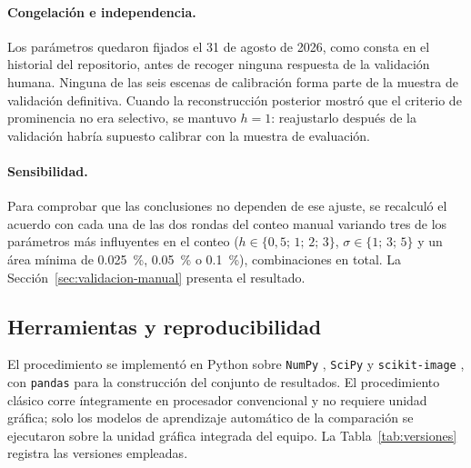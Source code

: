 \paragraph{Congelación e independencia.} Los parámetros quedaron fijados el 31 de agosto de
2026, como consta en el historial del repositorio, antes de recoger ninguna respuesta de la
validación humana. Ninguna de las seis escenas de calibración forma parte de la muestra de
validación definitiva. Cuando la reconstrucción posterior mostró que el criterio de
prominencia no era selectivo, se mantuvo $h = 1$: reajustarlo después de la
validación habría supuesto calibrar con la muestra de evaluación.

\paragraph{Sensibilidad.} Para comprobar que las conclusiones no dependen de ese ajuste, se
recalculó el acuerdo con cada una de las dos rondas del conteo manual variando tres de los parámetros más influyentes en el
conteo ($h \in \{0{,}5;\,1;\,2;\,3\}$, $\sigma \in \{1;\,3;\,5\}$ y un área mínima de
\SI{0.025}{\percent}, \SI{0.05}{\percent} o \SI{0.1}{\percent}), \cSenN{} combinaciones en
total. La Sección~\ref{sec:validacion-manual} presenta el resultado.

\subsection{Herramientas y reproducibilidad}
\label{sec:herramientas}

El procedimiento se implementó en Python sobre \texttt{NumPy}
\citep{harris2020numpy}, \texttt{SciPy} \citep{virtanen2020scipy} y
\texttt{scikit-image} \citep{vanderwalt2014skimage}, con \texttt{pandas} para la
construcción del conjunto de resultados. El procedimiento clásico corre íntegramente en
procesador convencional y no requiere unidad gráfica; solo los modelos de aprendizaje
automático de la comparación se ejecutaron sobre la unidad gráfica integrada del equipo. La Tabla~\ref{tab:versiones} registra las versiones
empleadas.

